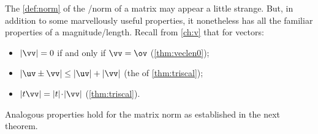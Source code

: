 The \autoref{def:norm} of the \slash norm of a matrix may appear a little strange. 
But, in addition to some marvellously useful properties, it nonetheless has all the familiar properties of a magnitude\slash length.
Recall from \autoref{ch:v} that for vectors:
\begin{itemize}
\item \(|\vv|=0\) if and only if \(\vv=\ov\) (\autoref{thm:veclen0});
\item \(|\uv\pm\vv|\leq|\uv|+|\vv|\) (the  of \autoref{thm:triscal});
\item \(|t\vv|=|t|\cdot|\vv|\) (\autoref{thm:triscal}).
\end{itemize}
Analogous properties hold for the matrix norm as established in the next theorem.




